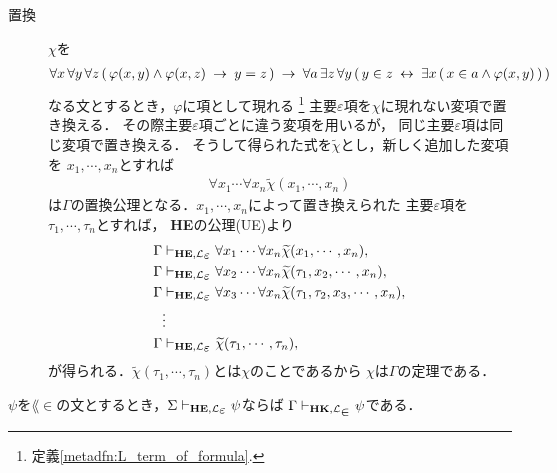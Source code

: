\begin{sketch}
\begin{description}
			\item[置換] $\chi$を
				\begin{align}
					\forall x\, \forall y\, \forall z\, 
					(\, \varphi(x,y) \wedge \varphi(x,z)
					\hspace{0.25em}\rightarrow\hspace{0.25em} y = z\, )
					\hspace{0.25em}\rightarrow\hspace{0.25em} \forall a\, \exists z\, \forall y\,
					(\, y \in z \hspace{0.25em}\leftrightarrow\hspace{0.25em} \exists x\, (\, x \in a \wedge 
					\varphi(x,y)\, )\, )
				\end{align}
				なる文とするとき，$\varphi$に項として現れる
				\footnote{
					定義\ref{metadfn:L_term_of_formula}.
				}
				主要$\varepsilon$項を$\chi$に現れない変項で置き換える．
				その際主要$\varepsilon$項ごとに違う変項を用いるが，
				同じ主要$\varepsilon$項は同じ変項で置き換える．
				そうして得られた式を$\widetilde{\chi}$とし，新しく追加した変項を
				$x_{1},\cdots,x_{n}$とすれば
				\begin{align}
					\forall x_{1} \cdots \forall x_{n} 
					\widetilde{\chi}(x_{1},\cdots,x_{n})
				\end{align}
				は$\Gamma$の置換公理となる．$x_{1},\cdots,x_{n}$によって置き換えられた
				主要$\varepsilon$項を$\tau_{1},\cdots,\tau_{n}$とすれば，
				{\bf HE}の公理(UE)より
				\begin{align}
					\Gamma &\provable{\mbox{{\bf HE}},\lang{\varepsilon}} \forall x_{1} \cdots \forall x_{n} \widetilde{\chi}(x_{1},\cdots,x_{n}), \\
					\Gamma &\provable{\mbox{{\bf HE}},\lang{\varepsilon}} \forall x_{2} \cdots \forall x_{n} \widetilde{\chi}(\tau_{1},x_{2},\cdots,x_{n}), \\
					\Gamma &\provable{\mbox{{\bf HE}},\lang{\varepsilon}} \forall x_{3} \cdots \forall x_{n} \widetilde{\chi}(\tau_{1},\tau_{2},x_{3},\cdots,x_{n}), \\
					&\vdots \\
					\Gamma &\provable{\mbox{{\bf HE}},\lang{\varepsilon}} \widetilde{\chi}(\tau_{1},\cdots,\tau_{n}), \\
				\end{align}
				が得られる．$\widetilde{\chi}(\tau_{1},\cdots,\tau_{n})$とは$\chi$のことであるから
				$\chi$は$\Gamma$の定理である．
				\QED
		\end{description}
	\end{sketch}
	
	\begin{screen}
		\begin{metathm}
		\label{metathm:Henkin_expansion_HE_to_HK}
			$\psi$を$\lang{\in}$の文とするとき，$\Sigma \provable{\mbox{{\bf HE}},\lang{\varepsilon}} \psi$ならば
			$\Gamma \provable{\mbox{{\bf HK}},\lang{\in}} \psi$である．
		\end{metathm}
	\end{screen}
	
